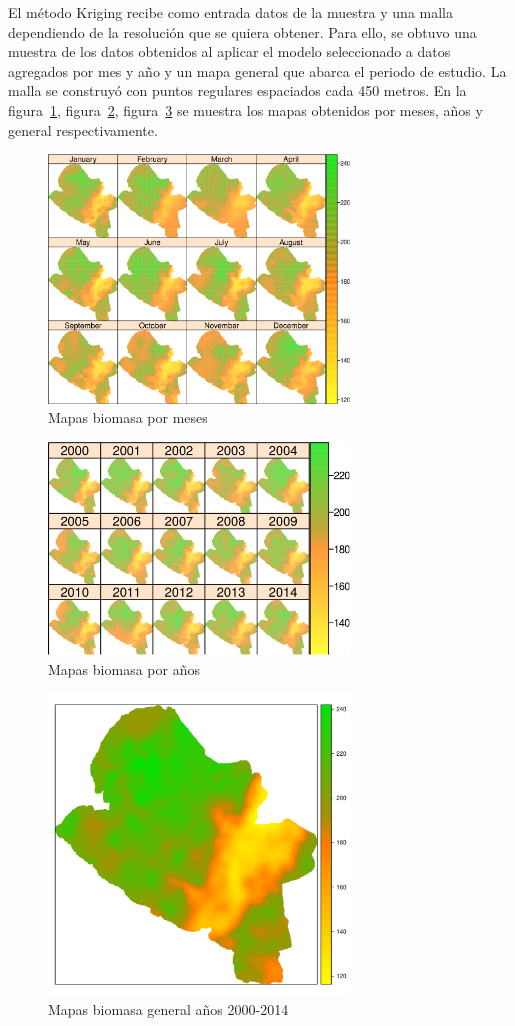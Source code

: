 El método Kriging recibe como entrada datos de la muestra y una malla dependiendo de la resolución que se quiera obtener. Para ello, se obtuvo una muestra de los datos obtenidos al aplicar el modelo seleccionado a datos agregados por mes y año y un mapa general que abarca el periodo de estudio.  La malla se construyó con puntos regulares espaciados cada 450 metros. En la figura~\ref{fig:biomasaMes}, figura~\ref{fig:biomasaAnio}, figura~\ref{fig:biomasaTotal}  se muestra los mapas obtenidos por meses, años y general respectivamente. 
 
\begin{figure}
  \centering
  \includegraphics[width = 8cm]{mapMonthsBiomass.pdf}
  \caption{Mapas biomasa por meses}
  \label{fig:biomasaMes}
\end{figure}

\begin{figure}
  \centering
  \includegraphics[width = 8cm]{mapYearsBiomass.pdf}
  \caption{Mapas biomasa por años}
  \label{fig:biomasaAnio}
\end{figure}

\begin{figure}
  \centering
  \includegraphics[width = 8cm]{mapGeneralBiomass.pdf}
  \caption{Mapas biomasa general años 2000-2014}
  \label{fig:biomasaTotal}
\end{figure}
